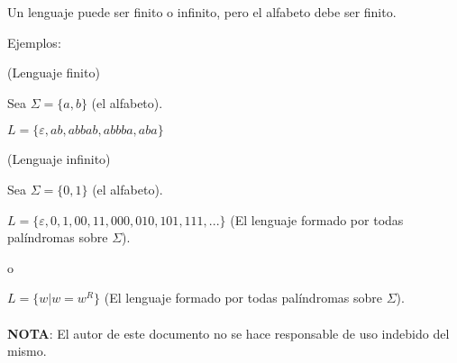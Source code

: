 \documentclass{article}
\begin{document}
Un lenguaje puede ser finito o infinito, pero el alfabeto debe ser finito.

Ejemplos:
\vspace{1em}

(Lenguaje finito)

Sea $\Sigma = \{a, b\}$ (el alfabeto).

$L = \{\varepsilon, ab, abbab, abbba, aba\}$
\vspace{1em}

(Lenguaje infinito)

Sea $\Sigma = \{0, 1\}$ (el alfabeto).

$L = \{\varepsilon, 0, 1, 00, 11, 000, 010, 101, 111, ...\}$ (El lenguaje formado
por todas palíndromas sobre $\Sigma$).
\vspace{1em}

o
\vspace{1em}

$L = \{w | w = w^R\}$ (El lenguaje formado por todas palíndromas sobre $\Sigma$).

\paragraph{}
\textbf{NOTA}: El autor de este documento no se hace responsable de uso indebido del
mismo.
\end{document}

